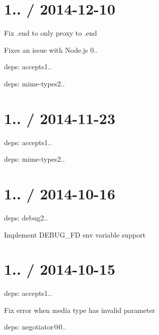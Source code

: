 \section*{1.. / 2014-\/12-\/10 }


\begin{DoxyItemize}
\item Fix {\ttfamily .end} to only proxy to {\ttfamily .end}
\begin{DoxyItemize}
\item Fixes an issue with Node.\+js 0..
\end{DoxyItemize}
\item deps\+: accepts1..
\begin{DoxyItemize}
\item deps\+: mime-\/types2..
\end{DoxyItemize}
\end{DoxyItemize}

\section*{1.. / 2014-\/11-\/23 }


\begin{DoxyItemize}
\item deps\+: accepts1..
\begin{DoxyItemize}
\item deps\+: mime-\/types2..
\end{DoxyItemize}
\end{DoxyItemize}

\section*{1.. / 2014-\/10-\/16 }


\begin{DoxyItemize}
\item deps\+: debug2..
\begin{DoxyItemize}
\item Implement {\ttfamily D\+E\+B\+U\+G\+\_\+\+FD} env variable support
\end{DoxyItemize}
\end{DoxyItemize}

\section*{1.. / 2014-\/10-\/15 }


\begin{DoxyItemize}
\item deps\+: accepts1..
\begin{DoxyItemize}
\item Fix error when media type has invalid parameter
\item deps\+: negotiator@0..
\end{DoxyItemize}
\end{DoxyItemize}

